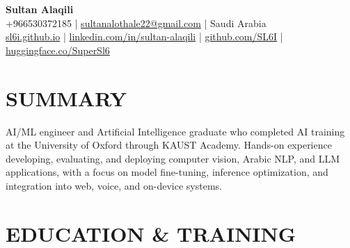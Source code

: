 \documentclass[a4paper,10pt]{article}
\begin{document}

\begin{center}
  \textbf{\Huge Sultan Alaqili}\\[3pt]
  \small
  +966530372185 \hspace{3pt}|\hspace{3pt}
  \href{mailto:sultanalothale22@gmail.com}
    {sultanalothale22@gmail.com}
  \hspace{3pt}|\hspace{3pt} Saudi Arabia\\[2pt]

  \href{https://sl6i.github.io/}{sl6i.github.io}
  \hspace{3pt}|\hspace{3pt}
  \href{https://linkedin.com/in/sultan-alaqili}
    {linkedin.com/in/sultan-alaqili}
  \hspace{3pt}|\hspace{3pt}
  \href{https://github.com/SL6I}{github.com/SL6I}
  \hspace{3pt}|\hspace{3pt}
  \href{https://huggingface.co/SuperSl6}
    {huggingface.co/SuperSl6}
\end{center}

\vspace{-9pt}


\section{SUMMARY}

AI/ML engineer and Artificial Intelligence graduate who completed AI training at the University of Oxford through KAUST Academy. Hands-on experience developing, evaluating, and deploying computer vision, Arabic NLP, and LLM applications, with a focus on model fine-tuning, inference optimization, and integration into web, voice, and on-device systems.


\section{EDUCATION \& TRAINING}
\end{document}
